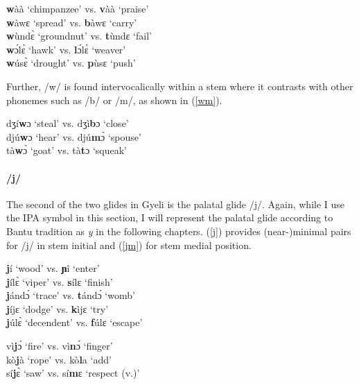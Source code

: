 \begin{exe} \ex \label{wini}
{\bfseries w}àà `chimpanzee' vs. {\bfseries v}àà `praise' \\
{\bfseries w}àwɛ `spread' vs. {\bfseries b}àwɛ `carry' \\
{\bfseries w}ùndɛ̀ `groundnut' vs. {\bfseries t}ùndɛ `fail' \\
{\bfseries w}ɔ́lɛ̀ `hawk' vs. {\bfseries l}ɔ́lɛ̀ `weaver' \\
{\bfseries w}úsɛ̀ `drought' vs. {\bfseries p}ùsɛ `push'
\end{exe}

\noindent Further, /w/ is found intervocalically within a stem where it contrasts with other phonemes such as /b/ or /m/, as shown in (\ref{wm}).

\begin{exe} \ex \label{wm}
dʒí{\bfseries w}ɔ `steal' vs. dʒì{\bfseries b}ɔ `close' \\
djú{\bfseries w}ɔ `hear' vs. djú{\bfseries m}ɔ̀ `spouse' \\
tà{\bfseries w}ɔ̀ `goat' vs. tà{\bfseries t}ɔ `squeak' 
\end{exe}

\paragraph{\bfseries /j/} The second of the two glides in Gyeli is the palatal glide /j/. Again, while I use the IPA symbol in this section, I will represent the palatal glide according to Bantu tradition as {\itshape y} in the following chapters. (\ref{j}) provides (near-)minimal pairs for /j/ in stem initial and (\ref{jm}) for stem medial position.

\begin{exe} \ex \label{j}
{\bfseries j}í `wood' vs. {\bfseries ɲ}î `enter' \\
{\bfseries j}ílɛ̀ `viper' vs. {\bfseries s}ílɛ `finish' \\
{\bfseries j}ándɔ́ `trace' vs. {\bfseries t}ándɔ́ `womb' \\
{\bfseries j}íjɛ `dodge' vs. {\bfseries k}ìjɛ `try' \\
{\bfseries j}úlɛ̀ `decendent' vs. {\bfseries f}úlɛ `escape'
\end{exe}

\begin{exe} \ex \label{jm}
vì{\bfseries j}ɔ́ `fire' vs. vì{\bfseries n}ɔ́ `finger' \\
 kò{\bfseries j}à `rope' vs. kò{\bfseries l}a `add' \\
sí{\bfseries j}ɛ̀ `saw' vs. sí{\bfseries m}ɛ `respect (v.)'
\end{exe}




